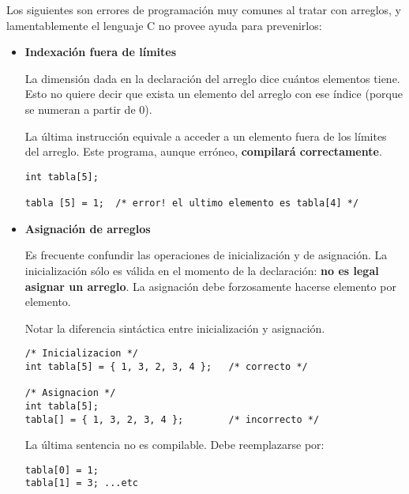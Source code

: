Los siguientes son errores de programación muy comunes al tratar con arreglos, y lamentablemente el lenguaje C no
provee ayuda para prevenirlos:
\begin{itemize}
\item \textbf{Indexación fuera de límites}
	
La dimensión dada en la declaración del arreglo dice cuántos elementos tiene.
Esto no quiere decir que exista un elemento del arreglo con ese índice (porque
se numeran a partir de 0).


\begin{ejemplo}
La última instrucción equivale a acceder a un elemento fuera de los límites del
arreglo. Este programa, aunque erróneo, \textbf{compilará correctamente}. 
\begin{lstlisting}
int tabla[5];

tabla [5] = 1;	/* error! el ultimo elemento es tabla[4] */
\end{lstlisting}
\end{ejemplo}





\item \textbf{Asignación de arreglos}

Es frecuente confundir las operaciones de inicialización y de asignación. La
inicialización sólo es válida en el momento de la declaración: \textbf{no es legal
asignar un arreglo}. La asignación debe forzosamente hacerse elemento por
elemento.

\begin{ejemplo}
Notar la diferencia sintáctica entre inicialización y asignación.
\begin{lstlisting}
/* Inicializacion */
int tabla[5] = { 1, 3, 2, 3, 4 }; 	/* correcto */

/* Asignacion */
int tabla[5];
tabla[] = { 1, 3, 2, 3, 4 }; 		/* incorrecto */
\end{lstlisting}
La última sentencia no es compilable. Debe reemplazarse por:
\begin{lstlisting}
tabla[0] = 1;
tabla[1] = 3; ...etc
\end{lstlisting}
\end{ejemplo}
\end{itemize}
